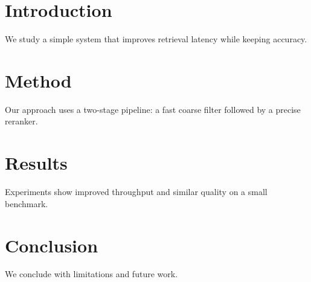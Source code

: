 \section{Introduction}
We study a simple system that improves retrieval latency while keeping accuracy.

\section{Method}
Our approach uses a two-stage pipeline: a fast coarse filter followed by a precise reranker.

\section{Results}
Experiments show improved throughput and similar quality on a small benchmark.

\section{Conclusion}
We conclude with limitations and future work.
